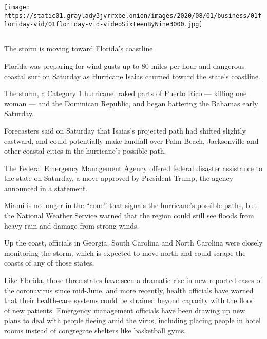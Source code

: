 \texttt{[image: https://static01.graylady3jvrrxbe.onion/images/2020/08/01/business/01floriday-vid/01floriday-vid-videoSixteenByNine3000.jpg]}

\subsection{}

The storm is moving toward Florida's coastline.

Florida was preparing for wind gusts up to 80 miles per hour and
dangerous coastal surf on Saturday as Hurricane Isaias churned toward
the state's coastline.

The storm, a Category 1 hurricane,
\href{https://www.nytimes3xbfgragh.onion/2020/07/31/us/hurricane-isaias.html}{raked
parts of Puerto Rico --- killing one woman --- and the Dominican
Republic}, and began battering the Bahamas early Saturday.

Forecasters said on Saturday that Isaias's projected path had shifted
slightly eastward, and could potentially make landfall over Palm Beach,
Jacksonville and other coastal cities in the hurricane's possible path.

The Federal Emergency Management Agency offered federal disaster
assistance to the state on Saturday, a move approved by President Trump,
the agency announced in a statement.

Miami is no longer in the
\href{https://www.nytimes3xbfgragh.onion/2018/09/11/climate/hurricane-evacuation-path-forecasts.html}{``cone''
that signals the hurricane's possible paths}, but the National Weather
Service
\href{https://forecast.weather.gov/showsigwx.php?warnzone=FLZ073\&warncounty=FLC086\&firewxzone=FLZ073\&local_place1=3\%20Miles\%20W\%20Palm\%20Springs\%20North\%20FL\&product1=Hurricane+Local+Statement\&lat=25.9366\&lon=-80.3793\#.XyWaz_hKjOQ}{warned}
that the region could still see floods from heavy rain and damage from
strong winds.

Up the coast, officials in Georgia, South Carolina and North Carolina
were closely monitoring the storm, which is expected to move north and
could scrape the coasts of any of those states.

Like Florida, those three states have seen a dramatic rise in new
reported cases of the coronavirus since mid-June, and more recently,
health officials have warned that their health-care systems could be
strained beyond capacity with the flood of new patients. Emergency
management officials have been drawing up new plans to deal with people
fleeing amid the virus, including placing people in hotel rooms instead
of congregate shelters like basketball gyms.


